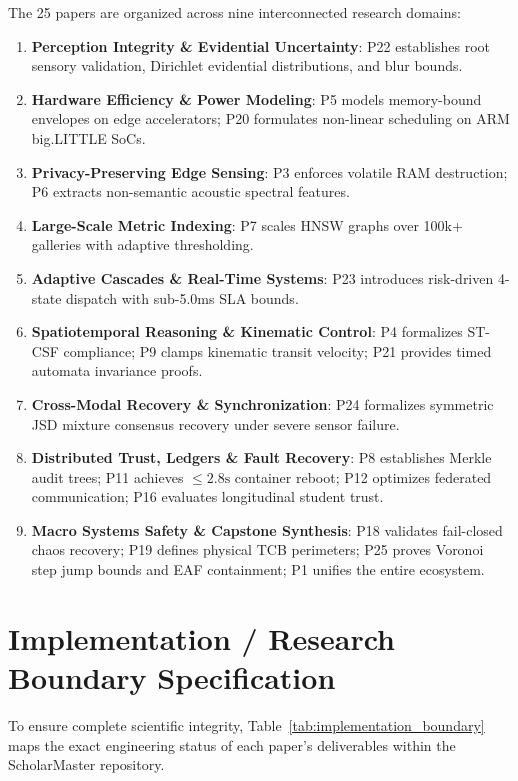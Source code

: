 \documentclass[11pt,letterpaper]{article}
\begin{document}
The 25 papers are organized across nine interconnected research domains:
\begin{enumerate}
    \item \textbf{Perception Integrity \& Evidential Uncertainty}: P22 establishes root sensory validation, Dirichlet evidential distributions, and blur bounds.
    \item \textbf{Hardware Efficiency \& Power Modeling}: P5 models memory-bound envelopes on edge accelerators; P20 formulates non-linear scheduling on ARM big.LITTLE SoCs.
    \item \textbf{Privacy-Preserving Edge Sensing}: P3 enforces volatile RAM destruction; P6 extracts non-semantic acoustic spectral features.
    \item \textbf{Large-Scale Metric Indexing}: P7 scales HNSW graphs over 100k+ galleries with adaptive thresholding.
    \item \textbf{Adaptive Cascades \& Real-Time Systems}: P23 introduces risk-driven 4-state dispatch with sub-5.0ms SLA bounds.
    \item \textbf{Spatiotemporal Reasoning \& Kinematic Control}: P4 formalizes ST-CSF compliance; P9 clamps kinematic transit velocity; P21 provides timed automata invariance proofs.
    \item \textbf{Cross-Modal Recovery \& Synchronization}: P24 formalizes symmetric JSD mixture consensus recovery under severe sensor failure.
    \item \textbf{Distributed Trust, Ledgers \& Fault Recovery}: P8 establishes Merkle audit trees; P11 achieves $\le 2.8\text{s}$ container reboot; P12 optimizes federated communication; P16 evaluates longitudinal student trust.
    \item \textbf{Macro Systems Safety \& Capstone Synthesis}: P18 validates fail-closed chaos recovery; P19 defines physical TCB perimeters; P25 proves Voronoi step jump bounds and EAF containment; P1 unifies the entire ecosystem.
\end{enumerate}

\section{Implementation / Research Boundary Specification}

To ensure complete scientific integrity, Table~\ref{tab:implementation_boundary} maps the exact engineering status of each paper's deliverables within the ScholarMaster repository.
\end{document}
